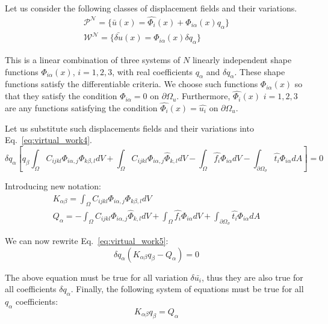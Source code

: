 \documentclass[en]{minipw} %
\begin{document}
Let us consider the following classes of displacement fields and their variations.
\begin{equation}
\begin{aligned}
\mathcal{P^{N}} = \{\bar{u}(x) = \hat{\Phi_i}(x) + \Phi_{i \alpha}(x)q_{\alpha} \}
\\
\mathcal{W^{N}} = \{\bar{\delta u}(x) = \Phi_{i \alpha}(x) \delta q_{\alpha} \}
\end{aligned}
\end{equation}

This is a linear combination of three systems of $N$ linearly independent shape functions $\Phi_{i \alpha}(x)$, $i = 1,2,3$, with real coefficients $q_{\alpha}$ and $\delta q_{\alpha}$. These shape functions satisfy the differentiable criteria. We choose such functions $\Phi_{i \alpha}(x)$ so that they satisfy the condition $\Phi_{i \alpha} = 0$ on $\partial \Omega_{u}$. Furthermore, $\hat{\Phi_i}(x)$ $i = 1,2,3$ are any functions satisfying the condition $\hat{\Phi_{i}}(x) = \hat{u_i}$ on $\partial \Omega_{u}$.

Let us substitute such displacements fields and their variations into Eq.~\ref{eq:virtual_work4}.
\begin{equation}
\label{eq:virtual_work5}
\delta q_{\alpha}[ q_{\beta} \int_{\Omega} C_{ijkl} \Phi_{i \alpha,j} \Phi_{k \beta,l} dV + \int_{\Omega} C_{ijkl} \Phi_{i \alpha,j} \hat{\Phi}_{k,l} dV - \int_{\Omega} \hat{f_i} \Phi_{i \alpha} dV - \int_{\partial \Omega_{\sigma}} \hat{t_i}\Phi_{i \alpha} dA] = 0
\end{equation}

Introducing new notation:
\begin{equation}
\begin{aligned}
K_{\alpha \beta} = \int_{\Omega} C_{ijkl} \Phi_{i \alpha,j} \Phi_{k \beta,l} dV 
\\
Q_{\alpha} = - \int_{\Omega} C_{ijkl} \Phi_{i \alpha,j} \hat{\Phi}_{k,l} dV + \int_{\Omega} \hat{f_i} \Phi_{i \alpha} dV + \int_{\partial \Omega_{\sigma}} \hat{t_i}\Phi_{i \alpha} dA
\end{aligned}
\end{equation}

We can now rewrite Eq.~\ref{eq:virtual_work5}:
\begin{equation}
\delta q_{\alpha}(K_{\alpha \beta} q_{\beta} - Q_{\alpha}) = 0
\end{equation}

The above equation must be true for all variation $\delta \bar{u_i}$, thus they are also true for all coefficients $\delta q_{\alpha}$. Finally, the following system of equations must be true for all $q_{\alpha}$ coefficients:
\begin{equation}
K_{\alpha \beta} q_{\beta} = Q_{\alpha}
\end{equation}
\end{document}
